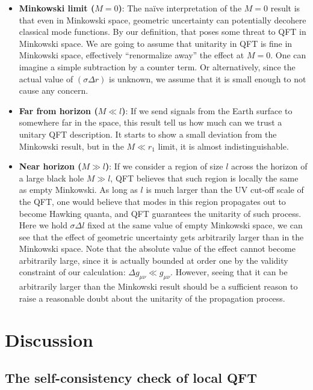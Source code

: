 \documentclass[aps,showpacs,onecolumn,floats,prd,superscriptaddress,nofootinbib]{revtex4-1}
\begin{document}
\begin{itemize}

\item \textbf{Minkowski limit ($M=0$)}: 
The na\"ive interpretation of the $M=0$ result is that even in Minkowski space, geometric uncertainty can potentially decohere classical mode functions.
By our definition, that poses some threat to QFT in Minkowski space.
We are going to assume that unitarity in QFT is fine in Minkowski space, effectively ``renormalize away'' the effect at $M=0$.
One can imagine a simple subtraction by a counter term.
Or alternatively, since the actual value of $(\sigma\Delta r)$ is unknown, we assume that it is small enough to not cause any concern.

\item \textbf{Far from horizon ($M \ll l$)}: 
If we send signals from the Earth surface to somewhere far in the space, this result tell us how much can we trust a unitary QFT description.
It starts to show a small deviation from the Minkowski result, but in the $M \ll r_1$ limit, it is almost indistinguishable. 

\item \textbf{Near horizon ($M \gg l$)}: 
If we consider a region of size $l$ across the horizon of a large black hole $M\gg l$, QFT believes that such region is locally the same as empty Minkowski.
As long as $l$ is much larger than the UV cut-off scale of the QFT, one would believe that modes in this region propagates out to become Hawking quanta, and QFT guarantees the unitarity of such process.
Here we hold $\sigma\Delta l$ fixed at the same value of empty Minkowski space, we can see that the effect of geometric uncertainty gets arbitrarily larger than in the Minkowski space.
Note that the absolute value of the effect cannot become arbitrarily large, since it is actually bounded at order one by the validity constraint of our calculation: $\Delta g_{\mu\nu} \ll g_{\mu\nu}$.
However, seeing that it can be arbitrarily larger than the Minkowski result should be a sufficient reason to raise a reasonable doubt about the unitarity of the propagation process.

\end{itemize}



\section{Discussion}
\label{sec-dis}

\subsection{The self-consistency check of local QFT}
\end{document}
